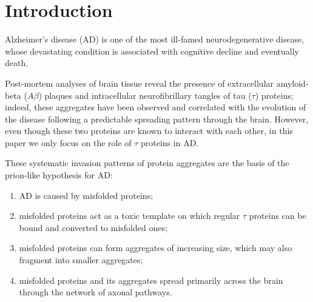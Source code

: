\documentclass{article}
\begin{document}

    \section{Introduction} \label{secIntroduction}

        Alzheimer's disease (AD) is one of the most ill-famed neurodegenerative disease, whose devastating condition is associated with cognitive decline and eventually death.

        Post-mortem analyses of brain tissue reveal the presence of extracellular amyloid-beta ($A\beta$) plaques and intracellular neurofibrillary tangles of tau ($\tau$) proteins; indeed, these aggregates have been observed and correlated with the evolution of the disease following a predictable spreading pattern through the brain. However, even though these two proteins are known to interact with each other, \cite[§ 3 on p. 3]{Goriely2019} in this paper we only focus on the role of $\tau$ proteins in AD.

        These systematic invasion patterns of protein aggregates are the basis of the prion-like hypothesis for AD:

        \begin{enumerate}[
            label=H\arabic*,  %
            topsep=7.5pt,     %
            itemsep=-1pt,     %
            leftmargin=30pt,  %
            rightmargin=20pt, %
            labelindent=30pt, %
        ] %
            \item AD is caused by misfolded proteins;\label{hypPrionHypothesisMisfolded}
            \item misfolded proteins act as a toxic template on which regular $\tau$ proteins can be bound and converted to misfolded ones;\label{hypPrionHypothesisTemplate}
            \item misfolded proteins can form aggregates of increasing size, which may also fragment into smaller aggregates;\label{hypPrionHypothesisAggregate}
            \item misfolded proteins and its aggregates spread primarily across the brain through the network of axonal pathways.\label{hypPrionHypothesisAxons}
        \end{enumerate}
\end{document}
